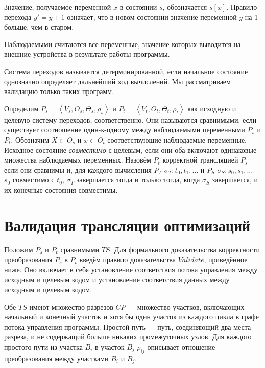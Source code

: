 Значение, получаемое переменной $x$ в состоянии $s$, обозначается $s[x]$. Правило перехода $y' = y + 1$ означает, что в новом состоянии значение переменной $y$ на 1 больше, чем в старом.

Наблюдаемыми считаются все переменные, значение которых выводится на внешние устройства в результате работы программы.

Система переходов называется детерминированной, если начальное состояние однозначно определяет дальнейший ход вычислений. Мы рассматриваем валидацию только таких программ.

Определим $P_{s} = \left\langle  V_{s}, O_{s}, \Theta_{s}, \rho_{s} \right\rangle $ и $P_{t} = \left\langle  V_{t}, O_{t}, \Theta_{t}, \rho_{t} \right\rangle $ как исходную и целевую систему переходов, соответственно. Они называются сравнимыми, если существует соотношение один-к-одному между наблюдаемыми переменными $P_{s}$ и $P_{t}$. Обозначим $ X \subset O_{s} $ и $ x \subset O_{t} $ соответствующие наблюдаемые переменные. Исходное состояние \emph{совместимо} с целевым, если они оба включают одинаковые множества наблюдаемых переменных. Назовём $P_{t}$ корректной трансляцией $P_{s}$ если они сравнимы и, для каждого вычисления $P_{T}$ $\sigma_{T}: t_{0}, t_{1}, \ldots$ и $P_{S}$ $\sigma_{S}: s_{0}, s_{1}, \ldots $ $s_{0}$ совместимо с $t_{0}$, $\sigma_{T}$ завершается тогда и только тогда, когда $\sigma_{S}$ завершается, и их конечные состояния совместимы.

\section{Валидация трансляции оптимизаций}

Положим $P_{s}$ и $P_{t}$ сравнимыми $TS$. Для формального доказательства корректности преобразования $P_{s}$ в $P_{t}$ введём правило доказательства $Validate$, приведённое ниже. Оно включает в себя установление соответствия потока управления между исходным и целевым кодом и установление соответствия данных между исходным и целевым кодом.

Обе $TS$ имеют множество разрезов $CP$ --- множество участков, включающих начальный и конечный участок и хотя бы один участок из каждого цикла в графе потока управления программы. Простой путь --- путь, соединяющий два места разреза, и не содержащий больше никаких промежуточных узлов. Для каждого простого пути из участка $B_{i}$ в участок $B_{j}$ $\rho_{ij}$ описывает отношение преобразования между участками $B_{i}$ и $B_{j}$.


